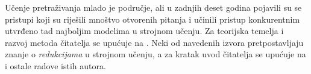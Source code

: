 Učenje pretraživanja mlado je područje, ali u zadnjih deset godina pojavili su
se pristupi koji su riješili mnoštvo otvorenih pitanja i učinili pristup
konkurentnim utvrđeno tad najboljim modelima u strojnom učenju. Za teorijska
temelja i razvoj \lts{} metoda čitatelja se upućuje na
\citep{collins2004incremental, daume2005learning, daume09searn, ross2011no,
doppa2014hc, ross2014reinforcement, daume15lols}. Neki od navedenih izvora
pretpostavljaju znanje o \textit{redukcijama} u strojnom učenju, a za kratak
uvod čitatelja se upućuje na \citep{beygelzimer2005error, daume15reductions} i
ostale radove istih autora.
